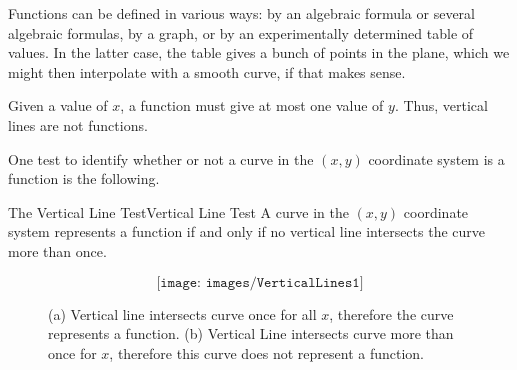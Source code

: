 Functions can be defined in various ways: by an algebraic formula or several
algebraic formulas, by a graph, or by an experimentally determined 
table of values. In the latter case, the table gives a bunch of 
points in the plane, which we might then
interpolate with a smooth curve, if that makes sense.

\vspace{3mm} 
Given a value of $x$, a function must give
at most one value of $y$.  Thus, vertical lines are not functions.  

One test to identify whether or not a curve in the $(x,y)$ coordinate 
system is a function is the following.

\begin{theorem}{The Vertical Line Test}{Vertical Line Test}
	\label{VertLineTest}
A curve in the $(x,y)$ coordinate system represents a function if and only if no vertical line intersects the curve more than once.
\end{theorem}

\begin{figure}[H]
	$$\texttt{[image: images/VerticalLines1]}$$
	
	\caption{(a) Vertical line intersects curve once for all $x$, therefore the curve represents a function. (b) Vertical Line intersects curve more than once for $x$, therefore this curve does not represent a function. }
\end{figure}


